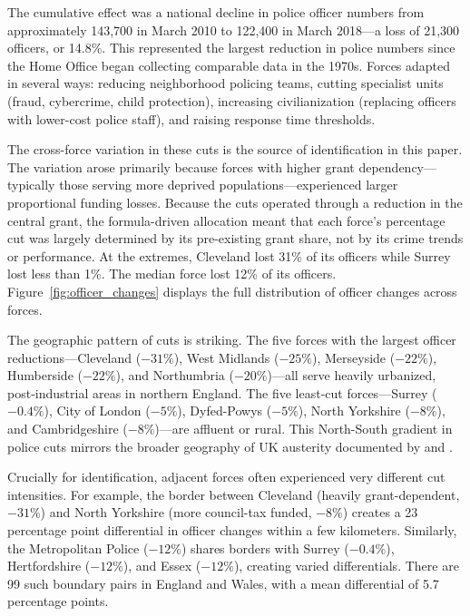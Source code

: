 \documentclass[12pt]{article}
\begin{document}
The cumulative effect was a national decline in police officer numbers from approximately 143,700 in March 2010 to 122,400 in March 2018---a loss of 21,300 officers, or 14.8\%. This represented the largest reduction in police numbers since the Home Office began collecting comparable data in the 1970s. Forces adapted in several ways: reducing neighborhood policing teams, cutting specialist units (fraud, cybercrime, child protection), increasing civilianization (replacing officers with lower-cost police staff), and raising response time thresholds.

The cross-force variation in these cuts is the source of identification in this paper. The variation arose primarily because forces with higher grant dependency---typically those serving more deprived populations---experienced larger proportional funding losses. Because the cuts operated through a reduction in the central grant, the formula-driven allocation meant that each force's percentage cut was largely determined by its pre-existing grant share, not by its crime trends or performance. At the extremes, Cleveland lost 31\% of its officers while Surrey lost less than 1\%. The median force lost 12\% of its officers. Figure~\ref{fig:officer_changes} displays the full distribution of officer changes across forces.

The geographic pattern of cuts is striking. The five forces with the largest officer reductions---Cleveland ($-31\%$), West Midlands ($-25\%$), Merseyside ($-22\%$), Humberside ($-22\%$), and Northumbria ($-20\%$)---all serve heavily urbanized, post-industrial areas in northern England. The five least-cut forces---Surrey ($-0.4\%$), City of London ($-5\%$), Dyfed-Powys ($-5\%$), North Yorkshire ($-8\%$), and Cambridgeshire ($-8\%$)---are affluent or rural. This North-South gradient in police cuts mirrors the broader geography of UK austerity documented by \citet{beatty2013} and \citet{fetzer2019}.

Crucially for identification, adjacent forces often experienced very different cut intensities. For example, the border between Cleveland (heavily grant-dependent, $-31\%$) and North Yorkshire (more council-tax funded, $-8\%$) creates a 23 percentage point differential in officer changes within a few kilometers. Similarly, the Metropolitan Police ($-12\%$) shares borders with Surrey ($-0.4\%$), Hertfordshire ($-12\%$), and Essex ($-12\%$), creating varied differentials. There are 99 such boundary pairs in England and Wales, with a mean differential of 5.7 percentage points.
\end{document}
